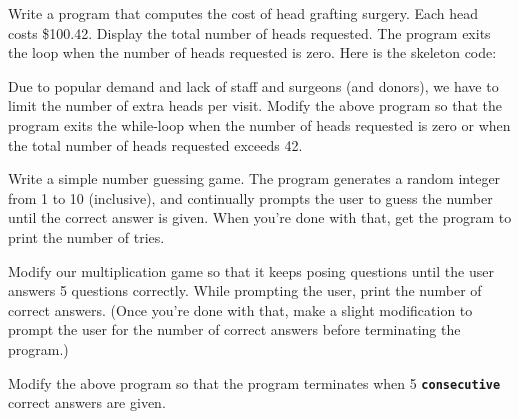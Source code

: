 \begin{ex} Write a program that computes the cost of head grafting
surgery. Each head costs \$100.42. Display the total number of heads
requested. The program exits the loop when the number of heads requested
is zero. Here is the skeleton code:
\end{ex}

\begin{ex}
Due to popular demand and lack of staff and surgeons
(and donors), we have to limit the number of extra heads per visit.
Modify the above program so that the program exits the while-loop when
the number of heads requested is zero or when the total number of heads
requested exceeds 42.
\end{ex}
\begin{ex} Write a simple number guessing game. The program
generates a random integer from 1 to 10 (inclusive), and continually
prompts the user to guess the number until the correct answer is given.
When you're done with that, get the program to print the
number of tries.
\end{ex}
\begin{ex} Modify our multiplication game so that it keeps
posing questions until the user answers 5 questions correctly. While
prompting the user, print the number of correct answers. (Once
you're done with that, make a slight modification to
prompt the user for the number of correct answers before terminating the
program.)
\end{ex}
\begin{ex} Modify the above program so that the program
terminates when 5 \texttt{\textbf{consecutive}} correct answers are given.
\end{ex}
\newpage{}

